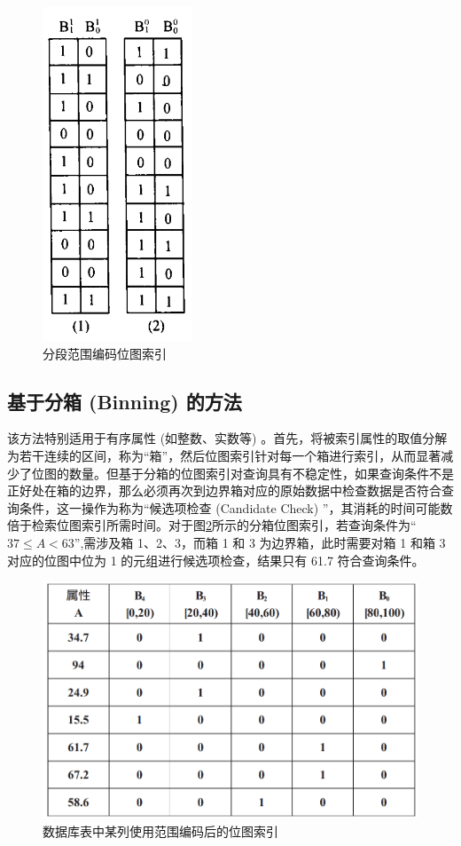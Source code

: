 \documentclass[11pt, a4paper]{article}
\begin{document}
  \begin{figure}[H]
    \centering
    \includegraphics[width=1.75in]{base3.png}
    \caption{分段范围编码位图索引}\label{fig:base3}
  \end{figure}


  \subsection{基于分箱 (Binning) 的方法}

  该方法特别适用于有序属性 (如整数、实数等) 。首先，将被索引属性的取值分解为若干连续的区间，称为“箱”，然后位图索引针对每一个箱进行索引，从而显著减少了位图的数量。但基于分箱的位图索引对查询具有不稳定性，如果查询条件不是正好处在箱的边界，那么必须再次到边界箱对应的原始数据中检查数据是否符合查询条件，这一操作为称为“候选项检查 (Candidate Check) ”，其消耗的时间可能数倍于检索位图索引所需时间。对于图\ref{fig:binning}所示的分箱位图索引，若查询条件为“$37 \leq A < 63$”,需涉及箱 1、2、3，而箱 1 和 3 为边界箱，此时需要对箱 1 和箱 3 对应的位图中位为 1 的元组进行候选项检查，结果只有 61.7 符合查询条件。

  \begin{figure}[H]
    \centering
      \includegraphics[width=5.5in]{binning.png}
      \caption{数据库表中某列使用范围编码后的位图索引}\label{fig:binning}
  \end{figure}
\end{document}
